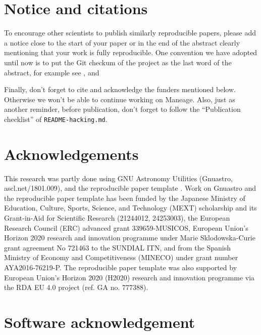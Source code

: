 \documentclass[10pt, twocolumn]{article}
\begin{document}
\section{Notice and citations}
To encourage other scientists to publish similarly reproducible papers,
please add a notice close to the start of your paper or in the end of the
abstract clearly mentioning that your work is fully reproducible. One
convention we have adopted until now is to put the Git checkum of the
project as the last word of the abstract, for example see
\citet{akhlaghi19}, \citet{infantesainz20} and \citet{akhlaghi20}

Finally, don't forget to cite \citet{akhlaghi20} and acknowledge the
funders mentioned below. Otherwise we won't be able to continue working on
Maneage. Also, just as another reminder, before publication, don't forget
to follow the ``Publication checklist'' of \texttt{README-hacking.md}.





\section{Acknowledgements}

This research was partly done using GNU Astronomy Utilities (Gnuastro,
ascl.net/1801.009), and the reproducible paper template
\projectversion. Work on Gnuastro and the reproducible paper template has
been funded by the Japanese Ministry of Education, Culture, Sports,
Science, and Technology (MEXT) scholarship and its Grant-in-Aid for
Scientific Research (21244012, 24253003), the European Research Council
(ERC) advanced grant 339659-MUSICOS, European Union’s Horizon 2020 research
and innovation programme under Marie Sklodowska-Curie grant agreement No
721463 to the SUNDIAL ITN, and from the Spanish Ministry of Economy and
Competitiveness (MINECO) under grant number AYA2016-76219-P.  The
reproducible paper template was also supported by European Union’s Horizon
2020 (H2020) research and innovation programme via the RDA EU 4.0 project
(ref. GA no. 777388).

\printbibliography

\appendix

\section{Software acknowledgement}


\end{document}
